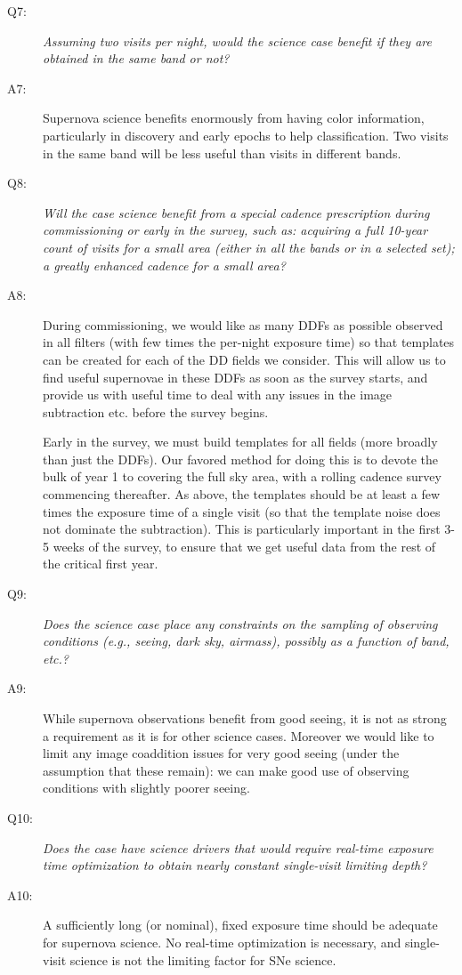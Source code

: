 \begin{description}
\item[Q7:] {\it Assuming two visits per night, would the science case
benefit if they are obtained in the same band or not?}



\item[A7:]Supernova science benefits enormously from having color information,
particularly in discovery and early epochs to help classification. Two
visits in the same band will be less useful than visits in different bands.

\item[Q8:] {\it Will the case science benefit from a special cadence
prescription during commissioning or early in the survey, such as:
acquiring a full 10-year count of visits for a small area (either in all
the bands or in a  selected set); a greatly enhanced cadence for a small
area?}



\item[A8:] During commissioning, we would like as many DDFs as possible observed in
all filters (with few times the per-night exposure time) so that templates
can be created for each of the DD fields we consider. This will allow us to
find useful supernovae in these DDFs as soon as the survey starts, and
provide us with useful time to deal with any issues in the image
subtraction etc. before the survey begins.

Early in the survey, we must build templates for all fields (more broadly
than just the DDFs). Our favored method for doing this is to devote the
bulk of year 1 to covering the full sky area, with a rolling cadence survey
commencing thereafter. As above, the templates should be at least a few
times the exposure time of a single visit (so that the template noise does
not dominate the subtraction). This is particularly important in the first
3-5 weeks of the survey, to ensure that we get useful data from the rest of
the critical first year.

\item[Q9:] {\it Does the science case place any constraints on the
sampling of observing conditions (e.g., seeing, dark sky, airmass),
possibly as a function of band, etc.?}


\item[A9:] While supernova observations benefit from good seeing, it is not as strong
a requirement as it is for other science cases. Moreover we would like to limit
any image coaddition issues for very good seeing (under the assumption that
these remain): we can make good use of observing conditions with slightly
poorer seeing.


\item[Q10:] {\it Does the case have science drivers that would require
real-time exposure time optimization to obtain nearly constant
single-visit limiting depth?}

\item[A10:]A sufficiently long (or nominal), fixed exposure time should be adequate
for supernova science. No real-time optimization is necessary, and
single-visit science is not the limiting factor for SNe science.


\end{description}
